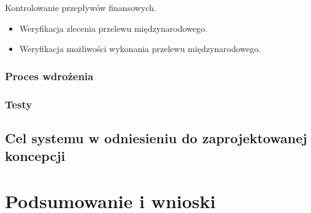 Kontrolowanie przepływów finansowych.
\begin{itemize}
\item{Weryfikacja zlecenia przelewu międzynarodowego.}
\item{Weryfikacja możliwości wykonania przelewu międzynarodowego.}
\end{itemize}


\subsection{Proces wdrożenia}
\subsection{Testy}
\section{Cel systemu w odniesieniu do zaprojektowanej koncepcji}
\chapter{Podsumowanie i wnioski}
